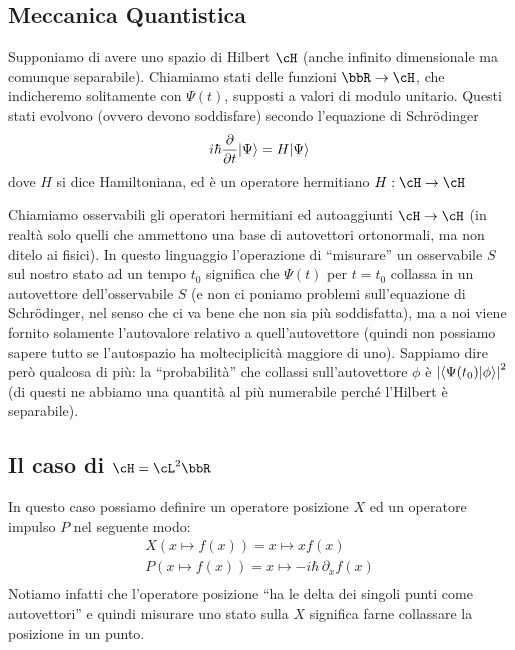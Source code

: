 \documentclass[10pt,a4paper]{article}
\begin{document}
\begin{multicols}{2}
  \clearpage
  
  \section*{Meccanica Quantistica}
  Supponiamo di avere uno spazio di Hilbert $\cH$ (anche infinito dimensionale ma comunque separabile). Chiamiamo stati delle funzioni $\bbR \rar \cH$, che indicheremo solitamente con $\Psi(t)$, supposti a valori di modulo unitario. Questi stati evolvono (ovvero devono soddisfare) secondo l'equazione di Schrödinger
  $$ i \hbar \frac{\partial {}}{\partial {t}} |\Psi\rangle = H |\Psi\rangle $$
  dove $H$ si dice Hamiltoniana, ed è un operatore hermitiano $H: \cH \rar \cH$
  
  Chiamiamo osservabili gli operatori hermitiani ed autoaggiunti $\cH \rar \cH$ (in realtà solo quelli che ammettono una base di autovettori ortonormali, ma non ditelo ai fisici). In questo linguaggio l'operazione di ``misurare'' un osservabile $S$ sul nostro stato ad un tempo $t_0$ significa che $\Psi(t)$ per $t = t_0$ collassa in un autovettore dell'osservabile $S$ (e non ci poniamo problemi sull'equazione di Schrödinger, nel senso che ci va bene che non sia più soddisfatta), ma a noi viene fornito solamente l'autovalore relativo a quell'autovettore (quindi non possiamo sapere tutto se l'autospazio ha molteciplicità maggiore di uno). Sappiamo dire però qualcosa di più: la ``probabilità'' che collassi sull'autovettore $\phi$ è $\left|{\langle \Psi(t_0) | \phi \rangle}\right|^2$ (di questi ne abbiamo una quantità al più numerabile perché l'Hilbert è separabile).

  \subsection*{Il caso di $\cH = \cL^2 \bbR$}
  In questo caso possiamo definire un operatore posizione $X$ ed un operatore impulso $P$ nel seguente modo:
  \begin{displaymath}
    \begin{array}{c}
      X(x \mapsto f(x)) = x \mapsto x f(x) \\
      P(x \mapsto f(x)) = x \mapsto -i \hbar \, \partial_x f(x) \\
    \end{array}
  \end{displaymath}
  Notiamo infatti che l'operatore posizione ``ha le delta dei singoli punti come autovettori'' e quindi misurare uno stato sulla $X$ significa farne collassare la posizione in un punto.


\end{multicols}
\end{document}
